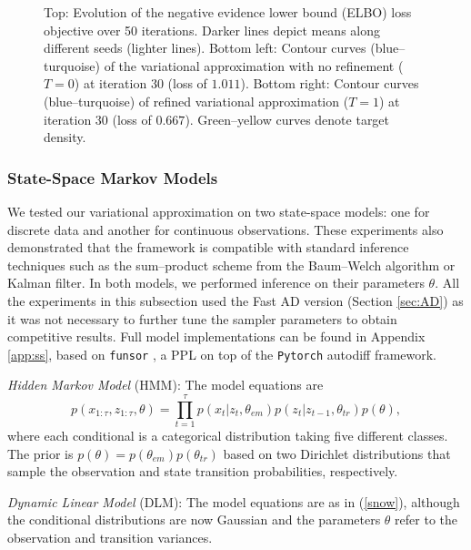 \begin{figure}[ht]
\begin{center}
\endminipage
\end{center}
\caption{{Top: Evolution of the negative evidence lower bound (ELBO) loss objective over  50 iterations. Darker lines depict means along different seeds (lighter lines). Bottom left: Contour curves (blue--turquoise) of the variational approximation with no refinement ($T=0$) at iteration 30 (loss of $1.011$). Bottom right: Contour curves (blue--turquoise) of  refined variational approximation ($T=1$) at iteration 30 (loss of $0.667$). Green--yellow curves denote target density.}} \label{fig:funnel}
\end{figure}


\subsubsection*{State-Space  Markov Models}

We tested our variational approximation on two state-space models: one for discrete data and another for continuous observations. These experiments also demonstrated that the framework is compatible with standard inference techniques such as the sum--product scheme from the Baum--Welch algorithm or Kalman filter.
In both models, we performed inference on their 
parameters $\theta$.
All the experiments in this subsection used the Fast AD version (Section \ref{sec:AD}) as it was not necessary to further tune the sampler parameters to obtain competitive results. Full model implementations can be found in Appendix \ref{app:ss}, based on \texttt{funsor} \parencite{obermeyer2019functional}, a PPL on top of the \texttt{Pytorch} autodiff framework.



\emph{Hidden Markov Model} (HMM): The model equations are
\begin{equation}\label{snow}
p(x_{1:\tau} , z_{1:\tau}, \theta) = \prod_{t=1}^\tau p(x_t|z_t,\theta_{em})p(z_t|z_{t-1},\theta_{tr})p(\theta),
\end{equation}
where each conditional is a categorical distribution taking 
five different classes.  The prior is $p(\theta) = p(\theta_{em})p(\theta_{tr})$ based on two Dirichlet distributions that sample the observation and state transition probabilities, respectively. 

\emph{Dynamic Linear Model} (DLM): The model
equations are as in (\ref{snow}), %
although the conditional distributions are now Gaussian and the parameters $\theta$ refer to the observation and transition variances. 

